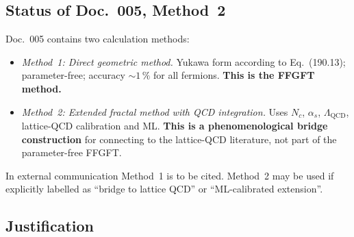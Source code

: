 \begin{center}
{\footnotesize
{}
}
\end{center}

\subsection*{Status of Doc.~005, Method~2}

Doc.~005 contains two calculation methods:
\begin{itemize}
  \item \emph{Method~1: Direct geometric method.} Yukawa form
        according to Eq.~(190.13); parameter-free; accuracy $\sim 1\,\%$
        for all fermions. \textbf{This is the FFGFT method.}
  \item \emph{Method~2: Extended fractal method with QCD
        integration.} Uses $N_c$, $\alpha_s$, $\Lambda_{\text{QCD}}$,
        lattice-QCD calibration and ML.
        \textbf{This is a phenomenological bridge construction}
        for connecting to the lattice-QCD literature, not part
        of the parameter-free FFGFT.
\end{itemize}

In external communication Method~1 is to be cited. Method~2 may
be used if explicitly labelled as \enquote{bridge to lattice QCD}
or \enquote{ML-calibrated extension}.

\subsection*{Justification}

